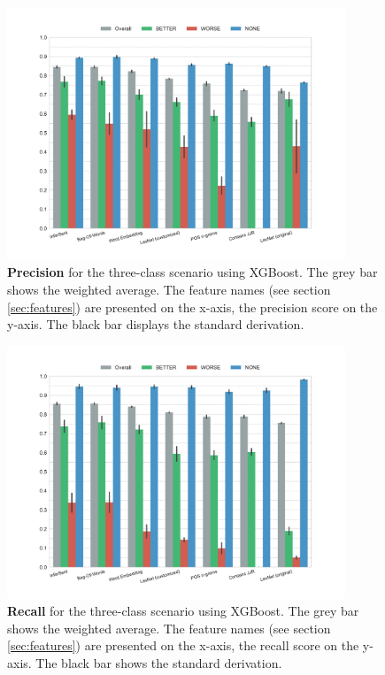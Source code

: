 \begin{figure}[p]
         \caption{\textbf{Precision} for the three-class scenario using XGBoost. The grey bar shows the weighted average. The feature names (see section \ref{sec:features}) are presented on the x-axis, the precision score on the y-axis. The black bar displays the standard derivation.} 
    \label{fig:3_precision}
 \centering
	\includegraphics[width=0.9\textwidth]{images/experiments/precision-False}
\end{figure}

  \begin{figure}[p]
              \caption{\textbf{Recall} for the three-class scenario using XGBoost. The grey bar shows the weighted average. The feature names (see section \ref{sec:features}) are presented on the x-axis, the recall score on the y-axis. The black bar shows the standard derivation.} 
       \label{fig:3_recall}
 \centering
	\includegraphics[width=0.9\textwidth]{images/experiments/recall-False}
\end{figure}


